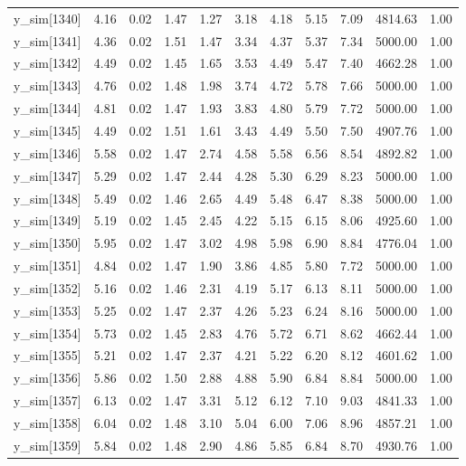 \begin{table}[ht]
\begin{tabular}{rrrrrrrrrrr}
  y\_sim[1340] & 4.16 & 0.02 & 1.47 & 1.27 & 3.18 & 4.18 & 5.15 & 7.09 & 4814.63 & 1.00 \\ 
  y\_sim[1341] & 4.36 & 0.02 & 1.51 & 1.47 & 3.34 & 4.37 & 5.37 & 7.34 & 5000.00 & 1.00 \\ 
  y\_sim[1342] & 4.49 & 0.02 & 1.45 & 1.65 & 3.53 & 4.49 & 5.47 & 7.40 & 4662.28 & 1.00 \\ 
  y\_sim[1343] & 4.76 & 0.02 & 1.48 & 1.98 & 3.74 & 4.72 & 5.78 & 7.66 & 5000.00 & 1.00 \\ 
  y\_sim[1344] & 4.81 & 0.02 & 1.47 & 1.93 & 3.83 & 4.80 & 5.79 & 7.72 & 5000.00 & 1.00 \\ 
  y\_sim[1345] & 4.49 & 0.02 & 1.51 & 1.61 & 3.43 & 4.49 & 5.50 & 7.50 & 4907.76 & 1.00 \\ 
  y\_sim[1346] & 5.58 & 0.02 & 1.47 & 2.74 & 4.58 & 5.58 & 6.56 & 8.54 & 4892.82 & 1.00 \\ 
  y\_sim[1347] & 5.29 & 0.02 & 1.47 & 2.44 & 4.28 & 5.30 & 6.29 & 8.23 & 5000.00 & 1.00 \\ 
  y\_sim[1348] & 5.49 & 0.02 & 1.46 & 2.65 & 4.49 & 5.48 & 6.47 & 8.38 & 5000.00 & 1.00 \\ 
  y\_sim[1349] & 5.19 & 0.02 & 1.45 & 2.45 & 4.22 & 5.15 & 6.15 & 8.06 & 4925.60 & 1.00 \\ 
  y\_sim[1350] & 5.95 & 0.02 & 1.47 & 3.02 & 4.98 & 5.98 & 6.90 & 8.84 & 4776.04 & 1.00 \\ 
  y\_sim[1351] & 4.84 & 0.02 & 1.47 & 1.90 & 3.86 & 4.85 & 5.80 & 7.72 & 5000.00 & 1.00 \\ 
  y\_sim[1352] & 5.16 & 0.02 & 1.46 & 2.31 & 4.19 & 5.17 & 6.13 & 8.11 & 5000.00 & 1.00 \\ 
  y\_sim[1353] & 5.25 & 0.02 & 1.47 & 2.37 & 4.26 & 5.23 & 6.24 & 8.16 & 5000.00 & 1.00 \\ 
  y\_sim[1354] & 5.73 & 0.02 & 1.45 & 2.83 & 4.76 & 5.72 & 6.71 & 8.62 & 4662.44 & 1.00 \\ 
  y\_sim[1355] & 5.21 & 0.02 & 1.47 & 2.37 & 4.21 & 5.22 & 6.20 & 8.12 & 4601.62 & 1.00 \\ 
  y\_sim[1356] & 5.86 & 0.02 & 1.50 & 2.88 & 4.88 & 5.90 & 6.84 & 8.84 & 5000.00 & 1.00 \\ 
  y\_sim[1357] & 6.13 & 0.02 & 1.47 & 3.31 & 5.12 & 6.12 & 7.10 & 9.03 & 4841.33 & 1.00 \\ 
  y\_sim[1358] & 6.04 & 0.02 & 1.48 & 3.10 & 5.04 & 6.00 & 7.06 & 8.96 & 4857.21 & 1.00 \\ 
  y\_sim[1359] & 5.84 & 0.02 & 1.48 & 2.90 & 4.86 & 5.85 & 6.84 & 8.70 & 4930.76 & 1.00 \\ 

\end{tabular}
\end{table}
